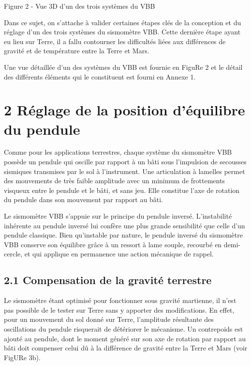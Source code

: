 \documentclass[10pt]{article}
\begin{document}
Figure 2 - Vue 3D d'un des trois systèmes du VBB

Dans ce sujet, on s'attache à valider certaines étapes clés de la conception et du réglage d'un des trois systèmes du sismomètre VBB. Cette dernière étape ayant eu lieu sur Terre, il a fallu contourner les difficultés liées aux différences de gravité et de température entre la Terre et Mars.

Une vue détaillée d'un des systèmes du VBB est fournie en FiguRe 2 et le détail des différents éléments qui le constituent est fourni en Annexe 1.

\section*{2 Réglage de la position d'équilibre du pendule}
Comme pour les applications terrestres, chaque système du sismomètre VBB possède un pendule qui oscille par rapport à un bâti sous l'impulsion de secousses sismiques transmises par le sol à l'instrument. Une articulation à lamelles permet des mouvements de très faible amplitude avec un minimum de frottements visqueux entre le pendule et le bâti, et sans jeu. Elle constitue l'axe de rotation du pendule dans son mouvement par rapport au bâti.

Le sismomètre VBB s'appuie sur le principe du pendule inversé. L'instabilité inhérente au pendule inversé lui confère une plus grande sensibilité que celle d'un pendule classique. Bien qu'instable par nature, le pendule inversé du sismomètre VBB conserve son équilibre grâce à un ressort à lame souple, recourbé en demi-cercle, et qui applique en permanence une action mécanique de rappel.

\subsection*{2.1 Compensation de la gravité terrestre}
Le sismomètre étant optimisé pour fonctionner sous gravité martienne, il n'est pas possible de le tester sur Terre sans y apporter des modifications. En effet, pour un mouvement du sol donné sur Terre, l'amplitude résultante des oscillations du pendule risquerait de détériorer le mécanisme. Un contrepoids est ajouté au pendule, dont le moment généré sur son axe de rotation par rapport au bâti doit compenser celui dû à la différence de gravité entre la Terre et Mars (voir FigURe 3b).
\end{document}
